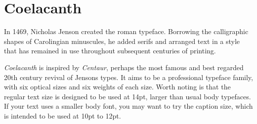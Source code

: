 \chapter[coelacanth]{Coelacanth}

In 1469, Nicholas Jenson created the roman typeface. Borrowing the calligraphic shapes of Carolingian minuscules, he added serifs and arranged text in a style that has remained in use throughout subsequent centuries of printing.

{\it Coelacanth} is inspired by {\it Centaur}, perhaps the most famous and best regarded 20th century revival of Jensons types. It aims to be a professional typeface family, with six optical sizes and six weights of each size. Worth noting is that the regular text size is designed to be used at 14pt, larger than usual body typefaces. If your text uses a smaller body font, you may want to try the caption size, which is intended to be used at 10pt to 12pt.

